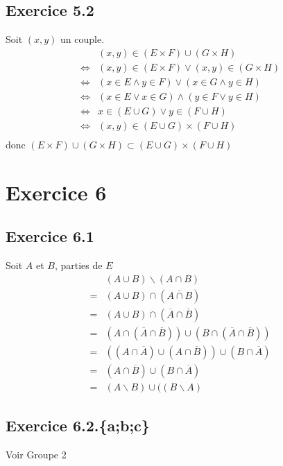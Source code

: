 \documentclass[a4paper,12pt]{article}
\begin{document}
\subsection{Exercice 5.2}
Soit $(x,y)$ un couple.
\[
\begin{aligned}
&(x,y)\in (E \times F) \cup ( G \times H)\\
\Leftrightarrow&(x, y) \in (E \times F) \vee (x,y) \in (G \times H)\\
\Leftrightarrow&(x \in E \wedge y \in F) \vee (x \in G \wedge y \in H) \\
\Leftrightarrow&(x \in E \vee x \in G) \wedge (y \in F \vee y \in H) \\
\Leftrightarrow&x\in (E \cup G) \vee y \in (F \cup H)\\
\Leftrightarrow&(x,y)\in (E \cup G) \times (F \cup H)\\
\end{aligned}
\]
donc  $(E \times F) \cup ( G \times H) \subset  (E \cup G) \times (F \cup H)$
\section{Exercice 6}
\subsection{Exercice 6.1}
Soit $A$ et $B$, parties de $E$
\[
\begin{aligned}
&(A \cup B) \backslash (A \cap B)\\
= &(A\cup B)\cap(\overline{A \cap B})\\
= &(A\cup B)\cap(\overline{A} \cap \overline{B})\\
= &(A \cap (\overline{A} \cap \overline{B}))\cup( B\cap (\overline{A} \cap \overline{B}))\\
= &((A \cap \overline{A}) \cup (A \cap \overline{B})) \cup (B \cap \overline{A})\\
= &(A \cap \overline{B}) \cup (B \cap \overline{A})\\
= &(A \backslash B)\cup((B \backslash A)
\end{aligned}
\]
\subsection{Exercice 6.2.\{a;b;c\}}
Voir Groupe 2
\end{document}

